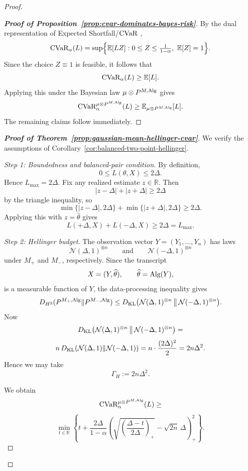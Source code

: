 \documentclass[conference]{IEEEtran}
\begin{document}
\begin{proof}[Proof]
\begin{proof}[\textbf{Proof of Proposition~\ref{prop:cvar-dominates-bayes-risk}}]
By the dual representation of Expected Shortfall/\(\textup{CVaR}\) \cite{ang2018dual},
\[
\textup{CVaR}_\alpha(L)
=
\sup\Bigl\{
\mathbb{E}[LZ]:
0\le Z\le \tfrac{1}{1-\alpha},\ \mathbb{E}[Z]=1
\Bigr\}.
\]
Since the choice \(Z\equiv 1\) is feasible, it follows that
\[
\textup{CVaR}_\alpha(L)\ge \mathbb{E}[L].
\]
Applying this under the Bayesian law \(\mu\otimes P^{M,\textup{Alg}}\) gives
\[
\textup{CVaR}_\alpha^{\mu\otimes P^{M,\textup{Alg}}}(L)
\ge
\mathbb{E}_{\mu\otimes P^{M,\textup{Alg}}}[L].
\]
The remaining claims follow immediately.
\end{proof}

\begin{proof}[\textbf{Proof of Theorem~\ref{prop:gaussian-mean-hellinger-cvar}}]
We verify the assumptions of Corollary~\ref{cor:balanced-two-point-hellinger}.

\medskip
\noindent
\textit{Step 1: Boundedness and balanced-pair condition.}
By definition,
\[
0\le L(\theta,X)\le 2\Delta.
\]
Hence \(L_{\max}=2\Delta\). Fix any realized estimate \(z\in\mathbb R\). Then
\[
|z-\Delta|+|z+\Delta|\ge 2\Delta
\]
by the triangle inequality, so
\[
\min\{|z-\Delta|,2\Delta\}+\min\{|z+\Delta|,2\Delta\}\ge 2\Delta.
\]
Applying this with \(z=\widehat\theta\) gives
\[
L(+\Delta,X)+L(-\Delta,X)\ge 2\Delta=L_{\max}.
\]

\medskip
\noindent
\medskip
\noindent
\textit{Step 2: Hellinger budget.}
The observation vector \(Y=(Y_1,\dots,Y_n)\) has laws
\[
\mathcal N(\Delta,1)^{\otimes n}
\qquad\text{and}\qquad
\mathcal N(-\Delta,1)^{\otimes n}
\]
under \(M_+\) and \(M_-\), respectively. Since the transcript
\[
X=(Y,\widehat\theta),\qquad \widehat\theta=\textup{Alg}(Y),
\]
is a measurable function of \(Y\), the data-processing inequality gives
\[
D_{H^2}(P^{M_+,\textup{Alg}}\|P^{M_-,\textup{Alg}})\le
D_{\textup{KL}}\bigl(\mathcal N(\Delta,1)^{\otimes n}\,\big\|\,\mathcal N(-\Delta,1)^{\otimes n}\bigr).
\]
Now
\[
D_{\textup{KL}}\bigl(\mathcal N(\Delta,1)^{\otimes n}\,\big\|\,\mathcal N(-\Delta,1)^{\otimes n}\bigr)
=\]
\[
n\,D_{\textup{KL}}(\mathcal N(\Delta,1)\|\mathcal N(-\Delta,1))
=
n\cdot \frac{(2\Delta)^2}{2}
=
2n\Delta^2.
\]
Hence we may take
\[
\Gamma_H:=2n\Delta^2.
\]

\medskip
\noindent
{}
We obtain
\[
\textup{CVaR}_\alpha^{\mu\otimes P^{M,\textup{Alg}}}(L)
\ge
\]
\[
\min_{t\in\mathbb R}
\left\{
t+\frac{2\Delta}{1-\alpha}
\left(
\sqrt{\left(\frac{\Delta-t}{2\Delta}\right)_+}
-\sqrt{2n}\,\Delta
\right)_+^2
\right\}.
\tag{A.11}
\]


\end{proof}
\end{proof}
\end{document}
